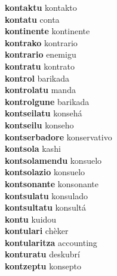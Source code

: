 \textbf{kontaktu } kontakto \\
\textbf{kontatu } conta \\
\textbf{kontinente } kontinente \\
\textbf{kontrako } kontrario \\
\textbf{kontrario } enemigu \\
\textbf{kontratu } kontrato \\
\textbf{kontrol } barikada \\
\textbf{kontrolatu } manda \\
\textbf{kontrolgune } barikada \\
\textbf{kontseilatu } konsehá \\
\textbf{kontseilu } konseho \\
\textbf{kontserbadore } konservativo \\
\textbf{kontsola } kashi \\
\textbf{kontsolamendu } konsuelo \\
\textbf{kontsolazio } konsuelo \\
\textbf{kontsonante } konsonante \\
\textbf{kontsulatu } konsulado \\
\textbf{kontsultatu } konsultá \\
\textbf{kontu } kuidou \\
\textbf{kontulari } chèker \\
\textbf{kontularitza } accounting \\
\textbf{konturatu } deskubrí \\
\textbf{kontzeptu } konsepto \\
